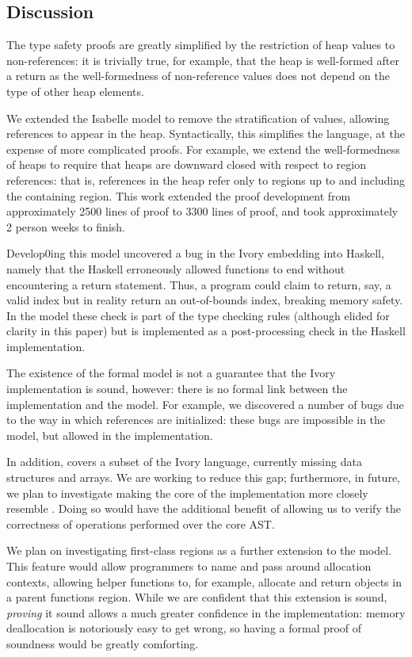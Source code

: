\subsection{Discussion}
\label{sec:sem-discuss}

The type safety proofs are greatly simplified by the restriction of
heap values to non-references: it is trivially true, for example, that
the heap is well-formed after a return as the well-formedness of
non-reference values does not depend on the type of other heap
elements.

We extended the Isabelle model to remove the stratification of values,
allowing references to appear in the heap.  Syntactically, this
simplifies the language, at the expense of more complicated proofs.
For example, we extend the well-formedness of heaps to require that
heaps are downward closed with respect to region references: that is,
references in the heap refer only to regions up to and including the
containing region.  This work extended the proof development from
approximately 2500 lines of proof to 3300 lines of proof, and took
approximately 2 person weeks to finish.

Develop0ing this model uncovered a bug in the Ivory embedding into
Haskell, namely that the Haskell erroneously allowed functions to
end without encountering a return statement.  Thus, a program could
claim to return, say, a valid index but in reality return an
out-of-bounds index, breaking memory safety.  In the model these
check is part of the type checking rules (although elided for clarity
in this paper) but is implemented as a post-processing check in the
Haskell implementation.  

The existence of the formal model is not a guarantee that the Ivory
implementation is sound, however: there is no formal link between the
implementation and the model.  For example, we discovered a number of
bugs due to the way in which references are initialized: these bugs
are impossible in the model, but allowed in the implementation.  

In addition, \coreivory{} covers a subset of the Ivory language,
currently missing data structures and arrays.  We are working to
reduce this gap; furthermore, in future, we plan to investigate making
the core of the implementation more closely resemble \coreivory{}.
Doing so would have the additional benefit of allowing us to verify
the correctness of operations performed over the core AST.

We plan on investigating first-class regions as a further extension to
the model.  This feature would allow programmers to name and pass
around allocation contexts, allowing helper functions to, for example,
allocate and return objects in a parent functions region.  While we
are confident that this extension is sound, \emph{proving} it sound
allows a much greater confidence in the implementation: memory
deallocation is notoriously easy to get wrong, so having a formal
proof of soundness would be greatly comforting. 

